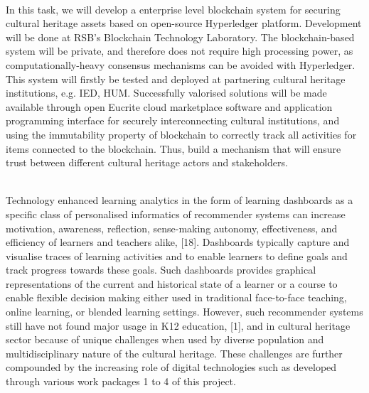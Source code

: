 \\
In this task, we will develop a enterprise level blockchain system for securing cultural heritage assets based on open-source Hyperledger platform. Development will be done at RSB’s Blockchain Technology Laboratory. The blockchain-based system will be private, and therefore does not require high processing power, as computationally-heavy consensus mechanisms can be avoided with Hyperledger. This system will firstly be tested and deployed at partnering cultural heritage institutions, e.g. IED, HUM. Successfully valorised solutions will be made available through open Eucrite cloud marketplace software and application programming interface for securely interconnecting cultural institutions, and using the immutability property of blockchain to correctly track all activities for items connected to the blockchain. Thus, build a mechanism that will ensure trust between different cultural heritage actors and stakeholders.

\\
Technology enhanced learning analytics in the form of learning dashboards as a specific class of personalised informatics of recommender systems can increase motivation, awareness, reflection, sense-making autonomy, effectiveness, and efficiency of learners and teachers alike, [18]. Dashboards typically capture and visualise traces of learning activities and to enable learners to define goals and track progress towards these goals. Such dashboards provides graphical representations of the current and historical state of a learner or a course to enable flexible decision making either used in traditional face-to-face teaching, online learning, or blended learning settings. However, such recommender systems still have not found major usage in K12 education, [1], and in cultural heritage sector because of unique challenges when used by diverse population and multidisciplinary nature of the cultural heritage. These challenges are further compounded by the increasing role of digital technologies such as developed through various work packages 1 to 4 of this project.



